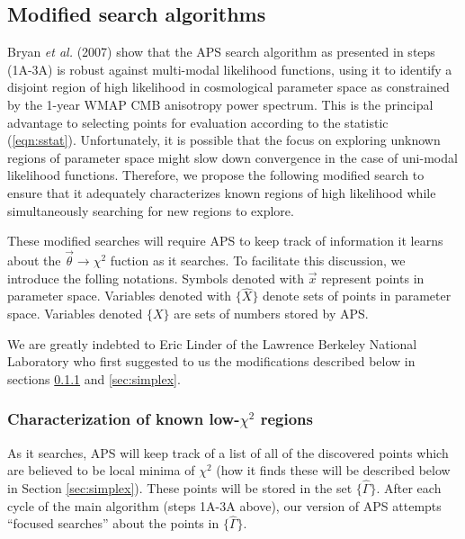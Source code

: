 \documentclass[useAMS,usenatbib]{aastex}
\begin{document}
\subsection{Modified search algorithms}

Bryan {\it et al.} (2007) show that the APS search algorithm as presented in steps (1A-3A)
is robust against multi-modal
likelihood functions, using it to identify a disjoint region of high likelihood in
cosmological parameter space as constrained by the 1-year WMAP CMB anisotropy power
spectrum.  This is the principal advantage to selecting points for evaluation according
to the statistic (\ref{eqn:sstat}).  Unfortunately, it is possible that the focus on 
exploring
unknown regions of parameter space might slow down convergence in the case of uni-modal
likelihood functions.  Therefore, we propose the following modified search
to ensure that it adequately characterizes known regions of high likelihood while
simultaneously searching for new regions to explore.

These modified searches will require APS to keep track of information it learns about the
$\vec{\theta}\rightarrow\chi^2$ fuction as it searches.  
To facilitate this discussion, we introduce the folling notations.
Symbols denoted with $\vec{x}$ represent points in parameter space.  Variables denoted with
$\{\hat{X}\}$ denote sets of points in parameter space.  Variables denoted $\{X\}$ are sets
of numbers stored by APS.

We are greatly indebted to Eric Linder of the Lawrence Berkeley National
Laboratory who first suggested to us the modifications described below
in sections \ref{sec:focus} and \ref{sec:simplex}.

\subsubsection{Characterization of known low-$\chi^2$ regions}
\label{sec:focus}

As it searches, APS will keep track of a list of all of the discovered points
which are believed to be local minima of $\chi^2$ 
(how it finds these will be described below
in Section \ref{sec:simplex}).  These points will be stored in the set
$\{\hat{\Gamma}\}$.  After each cycle of the main algorithm (steps 1A-3A above),
our version of APS attempts ``focused searches'' about the points in $\{\hat{\Gamma}\}$.  
\end{document}
